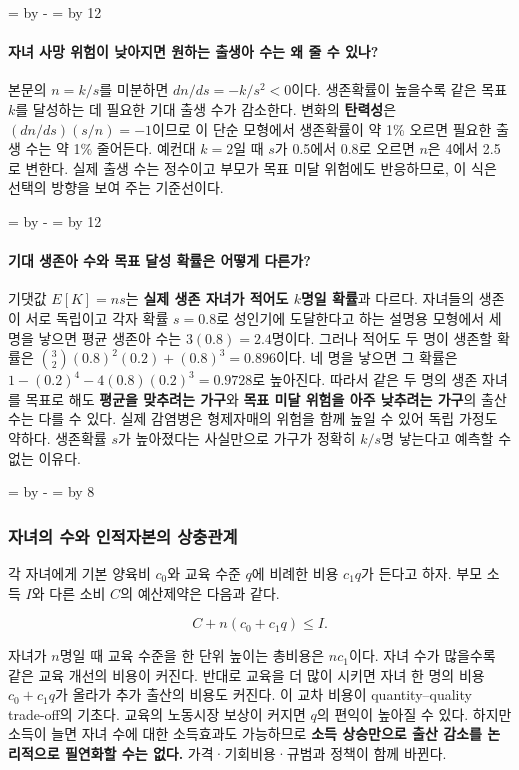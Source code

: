 \documentclass[10pt,a4paper]{article}
\newcommand{\ReserveQuestionSpace}{%
  \par\begingroup
  \dimen0=\pagegoal \advance\dimen0 by -\pagetotal
  \dimen2=\baselineskip \multiply\dimen2 by 12
  \ifdim\dimen0<\dimen2 \newpage\fi
  \endgroup}
\newcommand{\ReserveReadingSectionSpace}{%
  \par\begingroup
  \dimen0=\pagegoal \advance\dimen0 by -\pagetotal
  \dimen2=\baselineskip \multiply\dimen2 by 8
  \ifdim\dimen0<\dimen2 \newpage\fi
  \endgroup}
\begin{document}
\ReserveQuestionSpace
\paragraph{자녀 사망 위험이 낮아지면 원하는 출생아 수는 왜 줄 수 있나?}
본문의 $n=k/s$를 미분하면 $dn/ds=-k/s^2<0$이다. 생존확률이 높을수록 같은 목표 $k$를 달성하는 데 필요한 기대 출생 수가 감소한다. 변화의 \textbf{탄력성}은 $(dn/ds)(s/n)=-1$이므로 이 단순 모형에서 생존확률이 약 1\% 오르면 필요한 출생 수는 약 1\% 줄어든다. 예컨대 $k=2$일 때 $s$가 0.5에서 0.8로 오르면 $n$은 4에서 2.5로 변한다. 실제 출생 수는 정수이고 부모가 목표 미달 위험에도 반응하므로, 이 식은 선택의 방향을 보여 주는 기준선이다.\par

\ReserveQuestionSpace
\paragraph{기대 생존아 수와 목표 달성 확률은 어떻게 다른가?}
기댓값 $E[K]=ns$는 \textbf{실제 생존 자녀가 적어도 $k$명일 확률}과 다르다. 자녀들의 생존이 서로 독립이고 각자 확률 $s=0.8$로 성인기에 도달한다고 하는 설명용 모형에서 세 명을 낳으면 평균 생존아 수는 $3(0.8)=2.4$명이다. 그러나 적어도 두 명이 생존할 확률은 $\binom{3}{2}(0.8)^2(0.2)+(0.8)^3=0.896$이다. 네 명을 낳으면 그 확률은 $1-(0.2)^4-4(0.8)(0.2)^3=0.9728$로 높아진다. 따라서 같은 두 명의 생존 자녀를 목표로 해도 \textbf{평균을 맞추려는 가구}와 \textbf{목표 미달 위험을 아주 낮추려는 가구}의 출산 수는 다를 수 있다. 실제 감염병은 형제자매의 위험을 함께 높일 수 있어 독립 가정도 약하다. 생존확률 $s$가 높아졌다는 사실만으로 가구가 정확히 $k/s$명 낳는다고 예측할 수 없는 이유다.\par

\ReserveReadingSectionSpace
\subsubsection*{자녀의 수와 인적자본의 상충관계}

각 자녀에게 기본 양육비 $c_0$와 교육 수준 $q$에 비례한 비용 $c_1q$가 든다고 하자. 부모 소득 $I$와 다른 소비 $C$의 예산제약은 다음과 같다.\par

\[
C+n(c_0+c_1q)\leq I.
\]

자녀가 $n$명일 때 교육 수준을 한 단위 높이는 총비용은 $nc_1$이다. 자녀 수가 많을수록 같은 교육 개선의 비용이 커진다. 반대로 교육을 더 많이 시키면 자녀 한 명의 비용 $c_0+c_1q$가 올라가 추가 출산의 비용도 커진다. 이 교차 비용이 quantity–quality trade-off의 기초다. 교육의 노동시장 보상이 커지면 $q$의 편익이 높아질 수 있다. 하지만 소득이 늘면 자녀 수에 대한 소득효과도 가능하므로 \textbf{소득 상승만으로 출산 감소를 논리적으로 필연화할 수는 없다.} 가격·기회비용·규범과 정책이 함께 바뀐다.\par
\end{document}
